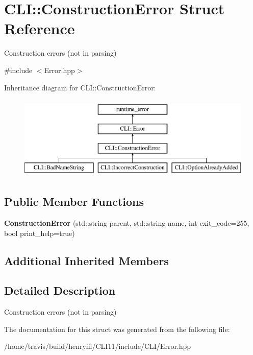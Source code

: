 \hypertarget{struct_c_l_i_1_1_construction_error}{}\section{C\+LI\+:\+:Construction\+Error Struct Reference}
\label{struct_c_l_i_1_1_construction_error}


Construction errors (not in parsing)  




{\ttfamily \#include $<$Error.\+hpp$>$}

Inheritance diagram for C\+LI\+:\+:Construction\+Error\+:\begin{figure}[H]
\begin{center}
\leavevmode
\includegraphics[height=4.000000cm]{struct_c_l_i_1_1_construction_error}
\end{center}
\end{figure}
\subsection*{Public Member Functions}
\begin{DoxyCompactItemize}
\item 
\mbox{\label{struct_c_l_i_1_1_construction_error_a4172d6e095e73b537c22023b9ad2ae5a}} 
{\bfseries Construction\+Error} (std\+::string parent, std\+::string name, int exit\+\_\+code=255, bool print\+\_\+help=true)
\end{DoxyCompactItemize}
\subsection*{Additional Inherited Members}


\subsection{Detailed Description}
Construction errors (not in parsing) 

The documentation for this struct was generated from the following file\+:\begin{DoxyCompactItemize}
\item 
/home/travis/build/henryiii/\+C\+L\+I11/include/\+C\+L\+I/Error.\+hpp\end{DoxyCompactItemize}
